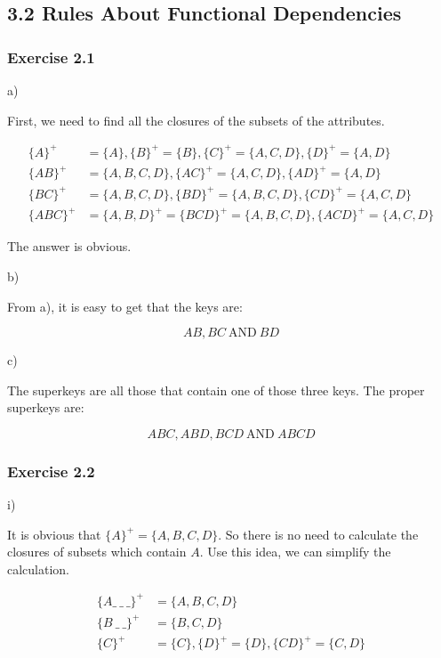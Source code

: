 \subsection*{3.2 Rules About Functional Dependencies}

\subsubsection*{Exercise 2.1}

a)

First, we need to find all the closures of the subsets
of the attributes.

\begin{align*}
  \{A\}^{+} &= \{A\},   \{B\}^{+} = \{B\},
  \{C\}^{+} = \{A, C, D\}, \{D\}^{+}= \{A,D\} \\
  \{AB\}^{+} &= \{A,B,C,D\},  \{AC\}^{+} = \{A,C,D\},
  \{AD\}^{+} = \{A,D\} \\
  \{BC\}^{+} &= \{A,B,C,D\}, \{BD\}^{+} = \{A,B,C,D\},
  \{CD\}^{+} = \{A,C,D\} \\
  \{ABC\}^{+} &= \{A,B,D\}^{+} = \{BCD\}^{+} = \{A,B,C,D\},
  \{ACD\}^{+} = \{A,C,D\}
\end{align*}

The answer is obvious.

b)

From a), it is easy to get that the keys are:

$$
AB, BC \ \mbox{AND} \ BD
$$

c)

The superkeys are all those that contain one of those three
keys. The proper superkeys are:

$$
ABC, ABD, BCD \ \mbox{AND} \ ABCD
$$

\subsubsection*{Exercise 2.2}

i)

It is obvious that $\{A\}^{+} = \{A,B,C,D\}$. So there is no
need to calculate the closures of subsets which contain $A$.
Use this idea, we can simplify the calculation.

\begin{align*}
  \{A \_ \ \_ \ \_ \}^{+} &= \{A,B,C,D\} \\
  \{B \ \_ \ \_ \}^{+} &= \{B,C,D\} \\
  \{C\}^{+} &= \{C\}, \{D\}^{+} = \{D\}, \{CD\}^{+} = \{C,D\}
\end{align*}

